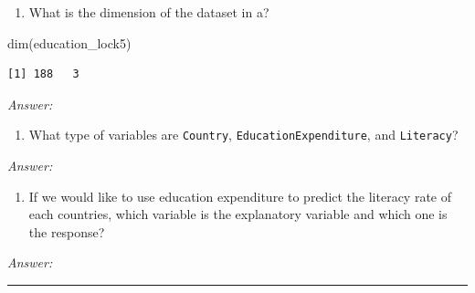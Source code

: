 \documentclass[
]{book}
\newenvironment{Shaded}{\begin{snugshade}}{\end{snugshade}}
\newcommand{\FunctionTok}[1]{\textcolor[rgb]{0.00,0.00,0.00}{#1}}
\newcommand{\NormalTok}[1]{#1}
\providecommand{\tightlist}{%
  \setlength{\itemsep}{0pt}\setlength{\parskip}{0pt}}
\begin{document}
\begin{enumerate}
\def\labelenumi{\alph{enumi}.}
\setcounter{enumi}{2}
\tightlist
\item
  What is the dimension of the dataset in a?
\end{enumerate}

\begin{Shaded}
\begin{Highlighting}[]
\FunctionTok{dim}\NormalTok{(education\_lock5)}
\end{Highlighting}
\end{Shaded}

\begin{verbatim}
[1] 188   3
\end{verbatim}

\emph{Answer:}

\vspace*{1in}

\begin{enumerate}
\def\labelenumi{\alph{enumi}.}
\setcounter{enumi}{3}
\tightlist
\item
  What type of variables are \texttt{Country}, \texttt{EducationExpenditure}, and \texttt{Literacy}?
\end{enumerate}

\emph{Answer:}

\vspace*{1in}

\begin{enumerate}
\def\labelenumi{\alph{enumi}.}
\setcounter{enumi}{4}
\tightlist
\item
  If we would like to use education expenditure to predict the literacy rate of each countries, which variable is the explanatory variable and which one is the response?
\end{enumerate}

\emph{Answer:}

\begin{center}\rule{0.5\linewidth}{0.5pt}\end{center}

  
\end{document}
